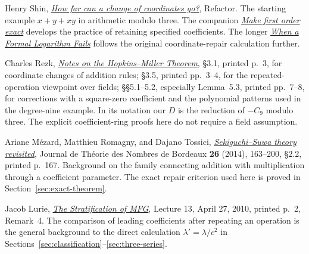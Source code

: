 \documentclass[11pt,letterpaper]{article}
\numberwithin{equation}{section}
\theoremstyle{definition}\newtheorem{example}[theorem]{Example}
\begin{document}
\begin{enumerate}[leftmargin=*,label={[\arabic*]},itemsep=.65em]
\item Henry Shin, \href{https://refactor.press/refactors/coordinate-repair}{\emph{How far can a change of coordinates go?}}, Refactor. The starting example \(x+y+xy\) in arithmetic modulo three. The companion \href{https://refactor.press/refactors/first-order}{\emph{Make first order exact}} develops the practice of retaining specified coefficients. The longer \href{https://refactor.press/notes/when-a-formal-logarithm-fails}{\emph{When a Formal Logarithm Fails}} follows the original coordinate-repair calculation further.

\item Charles Rezk, \href{https://www.sas.rochester.edu/mth/sites/doug-ravenel/otherpapers/hopkins-miller-thm.pdf}{\emph{Notes on the Hopkins--Miller Theorem}}, \S3.1, printed p.~3, for coordinate changes of addition rules; \S3.5, printed pp.~3--4, for the repeated-operation viewpoint over fields; \S\S5.1--5.2, especially Lemma~5.3, printed pp.~7--8, for corrections with a square-zero coefficient and the polynomial patterns used in the degree-nine example. In its notation our \(D\) is the reduction of \(-C_9\) modulo three. The explicit coefficient-ring proofs here do not require a field assumption.

\item Ariane M\'ezard, Matthieu Romagny, and Dajano Tossici, \href{https://www.numdam.org/item/10.5802/jtnb.863.pdf}{\emph{Sekiguchi--Suwa theory revisited}}, Journal de Th\'eorie des Nombres de Bordeaux \textbf{26} (2014), 163--200, \S2.2, printed p.~167. Background on the family connecting addition with multiplication through a coefficient parameter. The exact repair criterion used here is proved in Section~\ref{sec:exact-theorem}.

\item Jacob Lurie, \href{https://www.math.ias.edu/~lurie/252xnotes/Lecture13.pdf}{\emph{The Stratification of MFG}}, Lecture 13, April 27, 2010, printed p.~2, Remark~4. The comparison of leading coefficients after repeating an operation is the general background to the direct calculation \(\lambda'=\lambda/c^2\) in Sections~\ref{sec:classification}--\ref{sec:three-series}.
\end{enumerate}

\end{document}
